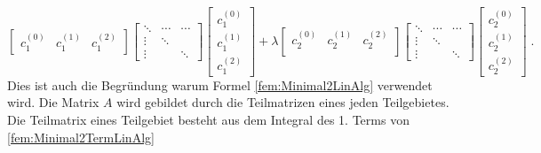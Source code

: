 \begin{equation}
\begin{bmatrix}
c_1^{(0)} &  c_1^{(1)} &  c_1^{(2)}  
\end{bmatrix}
\begin{bmatrix}
\ddots & \cdots &  \cdots    \\
\vdots & \ddots &   \\
\vdots &  & \ddots
\end{bmatrix}
\begin{bmatrix}
c_1^{(0)}  \\
c_1^{(1)} \\
c_1^{(2)}
\end{bmatrix}
+
\lambda
\begin{bmatrix}
c_2^{(0)} &  c_2^{(1)} &  c_2^{(2)}    \\   
\end{bmatrix}
\begin{bmatrix}
\ddots & \cdots &  \cdots    \\
\vdots & \ddots &   \\
\vdots &  & \ddots
\end{bmatrix}
\begin{bmatrix}
c_2^{(0)}  \\
c_2^{(1)} \\
c_2^{(2)}
\end{bmatrix} \; .
	\label{fem:MatrixKoeffizient}
\end{equation}
Dies ist auch die Begründung warum Formel \eqref{fem:Minimal2LinAlg} verwendet wird.
Die Matrix $A$ wird gebildet durch die Teilmatrizen eines jeden Teilgebietes. Die Teilmatrix eines Teilgebiet besteht  aus dem Integral des 1. Terms von \eqref{fem:Minimal2TermLinAlg} 

